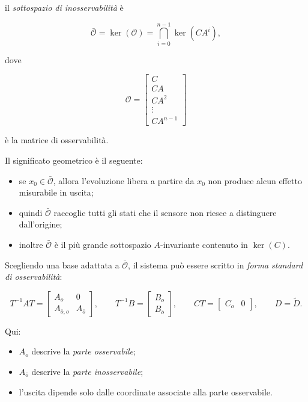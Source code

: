 il \emph{sottospazio di inosservabilità} è

\[
\bar{\mathcal O}
=
\ker(\mathcal O)
=
\bigcap_{i=0}^{n-1}\ker(CA^i),
\]

dove

\[
\mathcal O=
\begin{bmatrix}
C \\ CA \\ CA^2 \\ \vdots \\ CA^{n-1}
\end{bmatrix}
\]

è la matrice di osservabilità.

\medskip

Il significato geometrico è il seguente:

\begin{itemize}
    \item se \(x_0\in\bar{\mathcal O}\), allora l'evoluzione libera a partire da \(x_0\) non produce alcun effetto misurabile in uscita;
    \item quindi \(\bar{\mathcal O}\) raccoglie tutti gli stati che il sensore non riesce a distinguere dall'origine;
    \item inoltre \(\bar{\mathcal O}\) è il più grande sottospazio \(A\)-invariante contenuto in \(\ker(C)\).
\end{itemize}

\medskip

Scegliendo una base adattata a \(\bar{\mathcal O}\), il sistema può essere scritto in \emph{forma standard di osservabilità}:

\[
T^{-1}AT=
\begin{bmatrix}
A_o & 0 \\
A_{\bar o,o} & A_{\bar o}
\end{bmatrix},
\qquad
T^{-1}B=
\begin{bmatrix}
B_o \\ B_{\bar o}
\end{bmatrix},
\qquad
CT=
\begin{bmatrix}
C_o & 0
\end{bmatrix},
\qquad
D=\tilde D.
\]

Qui:
\begin{itemize}
    \item \(A_o\) descrive la \emph{parte osservabile};
    \item \(A_{\bar o}\) descrive la \emph{parte inosservabile};
    \item l'uscita dipende solo dalle coordinate associate alla parte osservabile.
\end{itemize}

